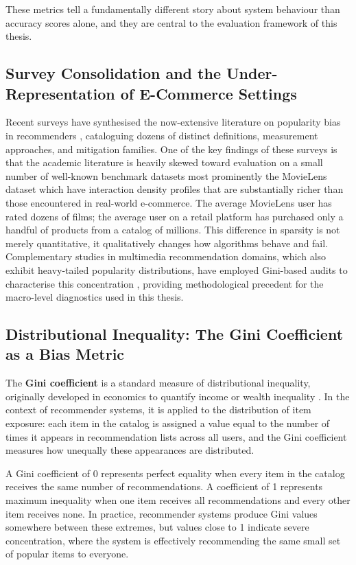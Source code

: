 \documentclass[11pt,a4paper]{report}
\begin{document}
These metrics tell a fundamentally different story about system behaviour than accuracy scores alone, and they are central to the evaluation framework of this thesis.

\subsection*{Survey Consolidation and the Under-Representation of E-Commerce Settings}

Recent surveys have synthesised the now-extensive literature on popularity bias in recommenders \citep{klimashevskaia2024survey}, cataloguing dozens of distinct definitions, measurement approaches, and mitigation families. One of the key findings of these surveys is that the academic literature is heavily skewed toward evaluation on a small number of well-known benchmark datasets most prominently the MovieLens dataset \citep{harper2015movielens} which have interaction density profiles that are substantially richer than those encountered in real-world e-commerce. The average MovieLens user has rated dozens of films; the average user on a retail platform has purchased only a handful of products from a catalog of millions. This difference in sparsity is not merely quantitative, it qualitatively changes how algorithms behave and fail. Complementary studies in multimedia recommendation domains, which also exhibit heavy-tailed popularity distributions, have employed Gini-based audits to characterise this concentration \citep{kowald2022multimedia}, providing methodological precedent for the macro-level diagnostics used in this thesis.

\subsection*{Distributional Inequality: The Gini Coefficient as a Bias Metric}

The \textbf{Gini coefficient} is a standard measure of distributional inequality, originally developed in economics to quantify income or wealth inequality \citep{cowell2011measuring}. In the context of recommender systems, it is applied to the distribution of item exposure: each item in the catalog is assigned a value equal to the number of times it appears in recommendation lists across all users, and the Gini coefficient measures how unequally these appearances are distributed.

A Gini coefficient of 0 represents perfect equality when every item in the catalog receives the same number of recommendations. A coefficient of 1 represents maximum inequality when one item receives all recommendations and every other item receives none. In practice, recommender systems produce Gini values somewhere between these extremes, but values close to 1 indicate severe concentration, where the system is effectively recommending the same small set of popular items to everyone.
\end{document}

